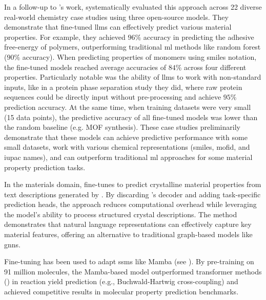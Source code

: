 In a follow-up to \textcite{jablonka2024leveraging}'s work, \textcite{vanherck2025assessment} systematically evaluated this approach across 22 diverse real-world chemistry case studies using three open-source models. They demonstrate that fine-tuned \glspl{llm} can effectively predict various material properties. For example, they achieved $96\%$ accuracy in predicting the adhesive free-energy of polymers, outperforming traditional \gls{ml} methods like random forest ($90\%$ accuracy). When predicting properties of monomers using \gls{smiles} notation, the fine-tuned models reached average accuracies of $84\%$ across four different properties. Particularly notable was the ability of \glspl{llm} to work with non-standard inputs, like in a protein phase separation study they did, where raw protein sequences could be directly input without pre-processing and achieve $95\%$ prediction accuracy. At the same time, when training datasets were very small (15 data points), the predictive accuracy of all fine-tuned models was lower than the random baseline (e.g. MOF synthesis). These case studies preliminarily demonstrate that these models can achieve predictive performance with some small datasets, work with various chemical representations (\gls{smiles}, \gls{mof}id, and \gls{iupac} names), and can outperform traditional \gls{ml} approaches for some material property prediction tasks.

In the materials domain,  fine-tunes \autocite{raffel2020exploring} to predict crystalline material properties from text descriptions generated by \autocite{ganose2019robocrystallographer}. By discarding ’s decoder and adding task-specific prediction heads, the approach reduces computational overhead while leveraging the model’s ability to process structured crystal descriptions. The method demonstrates that natural language representations can effectively capture key material features, offering an alternative to traditional graph-based models like \glspl{gnn}.

Fine-tuning has been used to adapt \glspl{ssm} like Mamba (see ). By pre-training on 91 million molecules, the Mamba-based model  outperformed transformer methods (\autocite{krzyzanowski2025exploring}) in reaction yield prediction (e.g., Buchwald-Hartwig cross-coupling) and achieved competitive results in molecular property prediction benchmarks.\autocite{soares2025mamba-based} 

